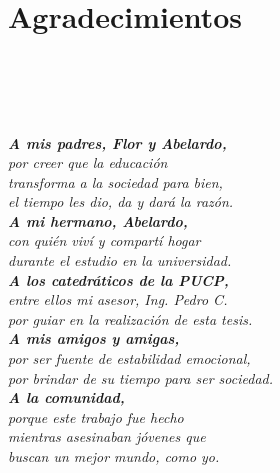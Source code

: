 
\newpage
\clearpage{\pagestyle{empty}\cleardoublepage}
\newpage

\chapter*{\centering \large Agradecimientos}

\begin{flushright}
	\; \\
	\; \\
	\; \\
	\; \\
	\textit{\textbf{A mis padres, Flor y Abelardo,}} \\
	\textit{por creer que la educación} \\
	\textit{transforma a la sociedad para bien,} \\
	\textit{el tiempo les dio, da y dará la razón.} \\
	\textit{\textbf{A mi hermano, Abelardo,}} \\
	\textit{con quién viví y compartí hogar} \\
	\textit{durante el estudio en la universidad.} \\
	\textit{\textbf{A los catedráticos de la PUCP,}} \\
	\textit{entre ellos mi asesor, Ing. Pedro C.} \\
	\textit{por guiar en la realización de esta tesis.} \\
	\textit{\textbf{A  mis amigos y amigas,}} \\
	\textit{por ser fuente de estabilidad emocional,} \\
	\textit{por brindar de su tiempo para ser sociedad.} \\
	\textit{\textbf{A  la comunidad,}} \\
	\textit{porque este trabajo fue hecho} \\
	\textit{mientras asesinaban jóvenes que} \\
	\textit{buscan un mejor mundo, como yo.} \\
	
\end{flushright}

